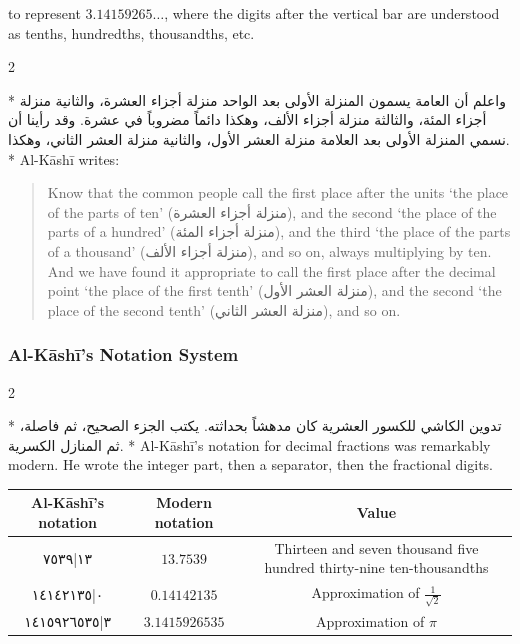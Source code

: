 \documentclass[11pt,a4paper]{article}
\newcommand{\ar}[1]{{\arabicfont\beginR #1\endR}}
\newenvironment{bilingual}{%
  \vspace{0.3em}%
  \begin{paracol}{2}%
}{%
  \end{paracol}%
  \vspace{0.3em}%
}
\begin{document}
\begin{center}
\end{center}

\noindent to represent $3.14159265\ldots$, where the digits after the
vertical bar are understood as tenths, hundredths, thousandths, etc.

\begin{bilingual}
\switchcolumn[0]*
\ar{واعلم أن العامة يسمون المنزلة الأولى بعد الواحد منزلة أجزاء العشرة، والثانية منزلة أجزاء المئة، والثالثة منزلة أجزاء الألف، وهكذا دائماً مضروباً في عشرة. وقد رأينا أن نسمي المنزلة الأولى بعد العلامة منزلة العشر الأول، والثانية منزلة العشر الثاني، وهكذا.}
\switchcolumn[1]*
Al-K\=ash\=i writes:

\begin{quote}
Know that the common people call the first place after the units `the
place of the parts of ten' (\ar{منزلة أجزاء العشرة}), and the second
`the place of the parts of a hundred' (\ar{منزلة أجزاء المئة}), and
the third `the place of the parts of a thousand'
(\ar{منزلة أجزاء الألف}), and so on, always multiplying by ten. And
we have found it appropriate to call the first place after the decimal
point `the place of the first tenth' (\ar{منزلة العشر الأول}), and
the second `the place of the second tenth'
(\ar{منزلة العشر الثاني}), and so on.
\end{quote}
\end{bilingual}

\subsubsection{Al-K\=ash\=i's Notation System}

\begin{bilingual}
\switchcolumn[0]*
\ar{تدوين الكاشي للكسور العشرية كان مدهشاً بحداثته. يكتب الجزء الصحيح، ثم فاصلة، ثم المنازل الكسرية.}
\switchcolumn[1]*
Al-K\=ash\=i's notation for decimal fractions was remarkably modern. He
wrote the integer part, then a separator, then the fractional digits.
\end{bilingual}

\begin{center}
\begin{tabular}{|c|c|c|}
\hline
\textbf{Al-K\=ash\=i's notation} & \textbf{Modern notation} & \textbf{Value} \\
\hline
\ar{١٣|٧٥٣٩} & $13.7539$ & Thirteen and seven thousand five
hundred thirty-nine ten-thousandths \\
\hline
\ar{٠|١٤١٤٢١٣٥} & $0.14142135$ & Approximation of
$\frac{1}{\sqrt{2}}$ \\
\hline
\ar{٣|١٤١٥٩٢٦٥٣٥} & $3.1415926535$ & Approximation of $\pi$ \\
\hline
\end{tabular}
\end{center}
\end{document}
